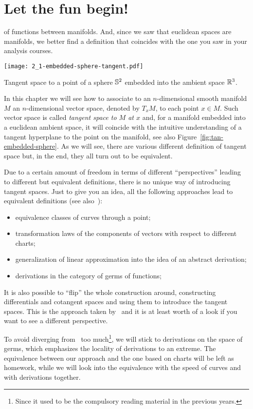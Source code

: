 \section{Let the fun begin!}
 of functions between manifolds.
And, since we saw that euclidean spaces are manifolds, we better find a definition that coincides with the one you saw in your analysis courses.

\begin{marginfigure}[7em]
  \texttt{[image: 2\_1-embedded-sphere-tangent.pdf]}
  \label{fig:tan-embedded-sphere}
  \caption{Tangent space to a point of a sphere $\mathbb{S}^2$ embedded into the ambient space $\mathbb{R}^3$.}
\end{marginfigure}
In this chapter we will see how to associate to an $n$-dimensional smooth manifold $M$ an $n$-dimensional vector space, denoted by $T_x M$, to each point $x\in M$.
Such vector space is called \emph{tangent space to $M$ at $x$} and, for a manifold embedded into a euclidean ambient space, it will coincide with the intuitive understanding of a tangent hyperplane to the point on the manifold, see also Figure~\ref{fig:tan-embedded-sphere}.
As we will see, there are various different definition of tangent space but, in the end, they all turn out to be equivalent.

Due to a certain amount of freedom in terms of different ``perspectives'' leading to different but equivalent definitions, there is no unique way of introducing tangent spaces.
Just to give you an idea, all the following approaches lead to equivalent definitions (see also~\cite{book:lee}):
\begin{itemize}
  \item equivalence classes of curves through a point;
  \item transformation laws of the components of vectors with respect to different charts;
  \item generalization of linear approximation into the idea of an abstract derivation;
  \item derivations in the category of germs of functions;
\end{itemize}

It is also possible to ``flip'' the whole construction around, constructing differentials and cotangent spaces and using them to introduce the tangent spaces.
This is the approach taken by~\cite{lectures:hitchin} and it is at least worth of a look if you want to see a different perspective.

To avoid diverging from~\cite{book:tu} too much\footnote{Since it used to be the compulsory reading material in the previous years.}, we will stick to derivations on the space of germs, which emphasizes the locality of derivations to an extreme.
The equivalence between our approach and the one based on charts will be left as homework, while we will look into the equivalence with the speed of curves and with derivations together.

